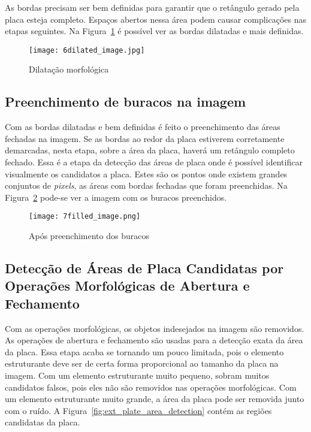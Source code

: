 As bordas precisam ser bem definidas para garantir que o retângulo gerado pela
placa esteja completo. Espaços abertos nessa área podem causar complicações nas
etapas seguintes. Na Figura~\ref{fig:ext_morphological_dilation} é possível ver
as bordas dilatadas e mais definidas.

\begin{figure}[H]
	\centering
	\texttt{[image: 6dilated\_image.jpg]}
	\caption{Dilatação morfológica}
	\label{fig:ext_morphological_dilation}
\end{figure}

\subsection{Preenchimento de buracos na imagem}

Com as bordas dilatadas e bem definidas é feito o preenchimento das áreas
fechadas na imagem. Se as bordas ao redor da placa estiverem corretamente
demarcadas, nesta etapa, sobre a área da placa, haverá um retângulo completo
fechado. Essa é a etapa da detecção das áreas de placa onde é possível
identificar visualmente os candidatos a placa. Estes são os pontos onde existem
grandes conjuntos de \emph{pixels}, as áreas com bordas fechadas que foram
preenchidas. Na Figura~\ref{fig:ext_holes_filled} pode-se ver a imagem com os
buracos preenchidos.

\begin{figure}[H]
	\centering
	\texttt{[image: 7filled\_image.png]}
	\caption{Após preenchimento dos buracos}
	\label{fig:ext_holes_filled}
\end{figure}

\subsection{Detecção de Áreas de Placa Candidatas por Operações Morfológicas de Abertura e Fechamento}

Com as operações morfológicas, os objetos indesejados na imagem são removidos.
As operações de abertura e fechamento são usadas para a detecção exata da área
da placa. Essa etapa acaba se tornando um pouco limitada, pois o elemento
estruturante deve ser de certa forma proporcional ao tamanho da placa na imagem.
Com um elemento estruturante muito pequeno, sobram muitos candidatos falsos,
pois eles não são removidos nas operações morfológicas. Com um elemento
estruturante muito grande, a área da placa pode ser removida junto com o ruído.
A Figura~\ref{fig:ext_plate_area_detection} contém as regiões candidatas da
placa.

